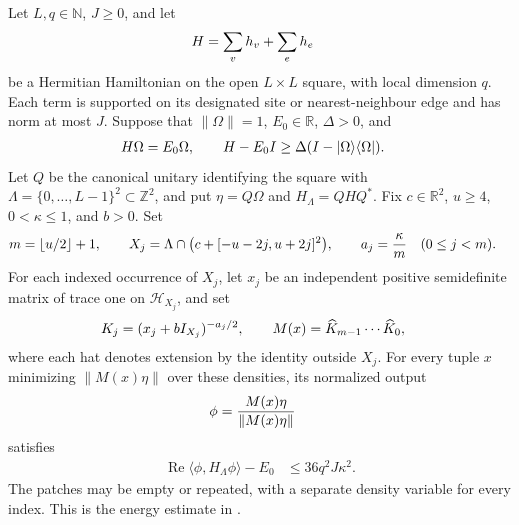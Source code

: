 \begin{theorem}
    \label{thm:peps_nested_patch_minimum_energy}
    Let $L,q\in\mathbb N$, $J\geq0$, and let
    \begin{align}
         & H=\sum_v h_v+\sum_e h_e \notag
    \end{align}
    be a Hermitian Hamiltonian on the open $L\times L$ square, with local
    dimension $q$. Each term is supported on its designated site or
    nearest-neighbour edge and has norm at most $J$.
    Suppose that $\|\Omega\|=1$, $E_0\in\mathbb R$, $\Delta>0$, and
    \begin{align}
         & H\Omega=E_0\Omega,\qquad
        H-E_0I\geq\Delta(I-|\Omega\rangle\langle\Omega|). \notag
    \end{align}
    Let $Q$ be the canonical unitary identifying the square with
    $\Lambda=\{0,\ldots,L-1\}^2\subset\mathbb Z^2$, and put
    $\eta=Q\Omega$ and $H_\Lambda=QHQ^*$.
    Fix $c\in\mathbb R^2$, $u\geq4$, $0<\kappa\leq1$, and $b>0$.
    Set
    \begin{align}
         & m=\lfloor u/2\rfloor+1,\qquad
        X_j=\Lambda\cap\bigl(c+[-u-2j,u+2j]^2\bigr),\qquad
        a_j=\frac{\kappa}{m}\quad(0\leq j<m). \notag
    \end{align}
    For each indexed occurrence of $X_j$, let $x_j$ be an independent
    positive semidefinite matrix of trace one on $\mathcal H_{X_j}$, and set
    \begin{align}
         & K_j=(x_j+bI_{X_j})^{-a_j/2},\qquad
        M(x)=\widehat K_{m-1}\cdots\widehat K_0, \notag
    \end{align}
    where each hat denotes extension by the identity outside $X_j$.
    For every tuple $x$ minimizing $\|M(x)\eta\|$ over these densities,
    its normalized output
    \begin{align}
         & \phi=\frac{M(x)\eta}{\|M(x)\eta\|} \notag
    \end{align}
    satisfies
    \begin{align}
        \operatorname{Re}\langle\phi,H_\Lambda\phi\rangle-E_0
         & \leq36q^2J\kappa^2.
        \label{eq:peps_nested_patch_minimum_energy}
    \end{align}
    The patches may be empty or repeated, with a separate density variable
    for every index. This is the energy estimate in
    \cite[Proposition~4.1]{OpenAI2026PolynomialPEPS}.
\end{theorem}
